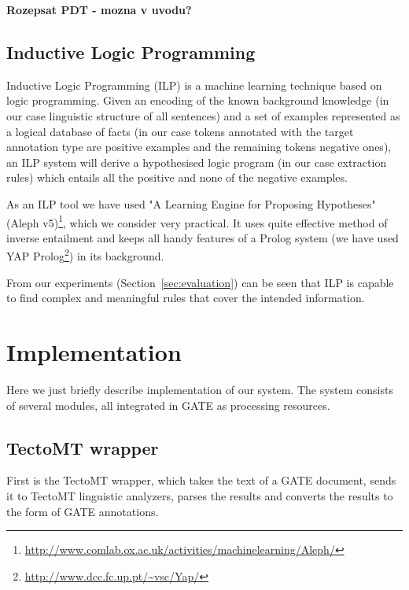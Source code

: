 \documentclass[runningheads,a4paper]{llncs}
\begin{document}
\textbf{Rozepsat PDT - mozna v uvodu?}



\subsection{Inductive Logic Programming}
Inductive Logic Programming (ILP) \cite{dedek:MuggletonILP} is a machine learning technique based on logic programming. Given an encoding of the known background knowledge (in our case linguistic structure of all sentences) and a set of examples represented as a logical database of facts (in our case tokens annotated with the target annotation type are positive examples and the remaining tokens negative ones), an ILP system will derive a hypothesised logic program (in our case extraction rules) which entails all the positive and none of the negative examples.

As an ILP tool we have used "A Learning Engine for Proposing Hypotheses" (Aleph v5)\footnote{\url{http://www.comlab.ox.ac.uk/activities/machinelearning/Aleph/}}, which we consider very practical. It uses quite effective method of inverse entailment \cite{biblio:InverseEntailment} and keeps all handy features of a Prolog system (we have used YAP Prolog\footnote{\url{http://www.dcc.fc.up.pt/~vsc/Yap/}}) in its background.


From our experiments (Section~\ref{sec:evaluation}) can be seen that ILP is capable to find complex and meaningful rules that cover the intended information.

%





\section{Implementation}
Here we just briefly describe implementation of our system. The system consists of several modules, all integrated in GATE as processing resources.

\subsection{TectoMT wrapper}
First is the TectoMT wrapper, which takes the text of a GATE document, sends it to TectoMT linguistic analyzers, parses the results and converts the results to the form of GATE annotations.
\end{document}
